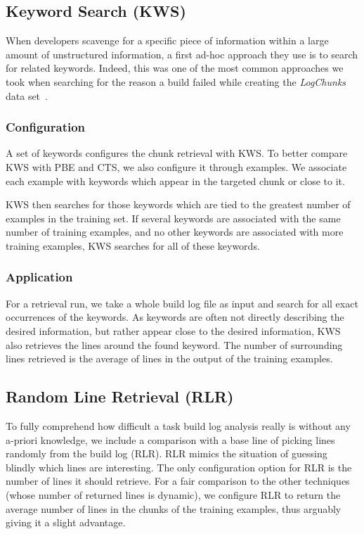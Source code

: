 \subsection{Keyword Search (KWS)}
When developers scavenge for a specific piece of information within a
large amount of unstructured information, a first ad-hoc approach they
use is to search for related keywords.
Indeed, this was one of the
most common approaches we took when searching for the reason a build
failed while creating the \emph{LogChunks} data
set~\cite{brandt2020logchunks}.

\subsubsection{Configuration}
A set of keywords configures the chunk retrieval with KWS\@.
To better
compare KWS with PBE and CTS, we also configure it through examples.
We associate each example with keywords which appear in the targeted
chunk or close to it.

KWS then searches for those keywords which are tied to the greatest
number of examples in the training set.
If several keywords are associated with the same number of training
examples, and no other keywords are associated with more training
examples, KWS searches for all of these keywords.

\subsubsection{Application}
For a retrieval run, we take a whole build log file as input and
search for all exact occurrences of the keywords.
As keywords are
often not directly describing the desired information, but rather
appear close to the desired information, KWS also retrieves the lines
around the found keyword.
The number of surrounding lines retrieved is
the average of lines in the output of the training examples.


\subsection{Random Line Retrieval (RLR)}
\label{sec:expl-rlr}

To fully comprehend how difficult a task build log analysis really
is without any a-priori knowledge, we include a comparison with a
base line of
picking lines randomly from the build log (RLR).
RLR mimics the
situation of guessing blindly which lines are interesting.
The only configuration option for RLR is the number of lines it should
retrieve.
For a fair comparison to the other techniques (whose number of
returned lines is dynamic), we configure RLR to return the average
number of lines in the chunks of the training examples, thus arguably
giving it a slight advantage.

